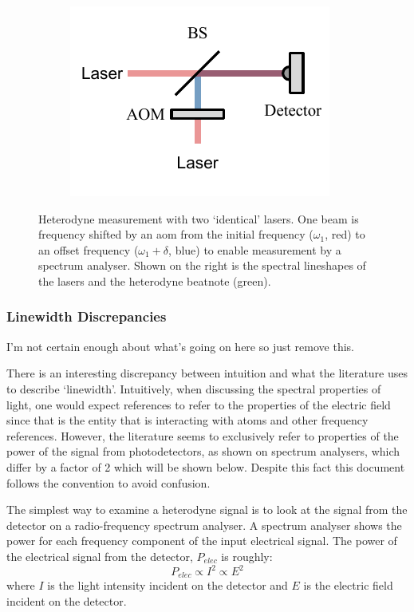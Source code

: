 \begin{figure}
    \begin{subfigure}{0.49\linewidth}
    \includegraphics{part1/Figs/HeterodyneTwoLasers.pdf}
    \end{subfigure}
    \begin{subfigure}{0.49\linewidth}
    
    \end{subfigure}
    \caption{Heterodyne measurement with two `identical' lasers. One beam is frequency shifted by an \gls{aom} from the initial frequency ($\omega_1$, red) to an offset frequency ($\omega_1+\delta$, blue) to enable measurement by a spectrum analyser. Shown on the right is the spectral lineshapes of the lasers and the heterodyne beatnote (green).}
\end{figure}

\subsubsection{Linewidth Discrepancies}
{\color{red}I'm not certain enough about what's going on here so just remove this.}

There is an interesting discrepancy between intuition and what the literature uses to describe `linewidth'.
Intuitively, when discussing the spectral properties of light, one would expect references to refer to the properties of the electric field since that is the entity that is interacting with atoms and other frequency references.
However, the literature seems to exclusively refer to properties of the power of the signal from photodetectors, as shown on spectrum analysers, which differ by a factor of 2 which will be shown below.
Despite this fact this document follows the convention to avoid confusion.

The simplest way to examine a heterodyne signal is to look at the signal from the detector on a radio-frequency spectrum analyser.
A spectrum analyser shows the power for each frequency component of the input electrical signal.
The power of the electrical signal from the detector, $P_{elec}$ is roughly:
\begin{equation}
P_{elec}\propto I^2 \propto E^2
\label{eq:beatnote_proportional}
\end{equation}
where $I$ is the light intensity incident on the detector and $E$ is the electric field incident on the detector.

